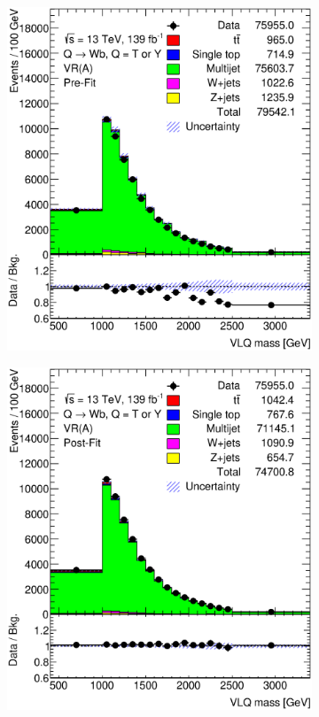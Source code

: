 \begin{figure}[hbt!]
	\centering
	\graphicspath{{figs/appendix/scaledmultijet/ABVLQM/}}
	\begin{subfigure}{.35\textwidth}
		\centering
		\includegraphics[width=\linewidth,height=\textheight,keepaspectratio]{VR_A_VLQM.eps}
		\caption{}
	\end{subfigure}\hspace{0.6cm}
	\begin{subfigure}{.35\textwidth}
		\centering
		\includegraphics[width=\linewidth,height=\textheight,keepaspectratio]{VR_A_VLQM_postFit.eps}

\end{subfigure}
\end{figure}
